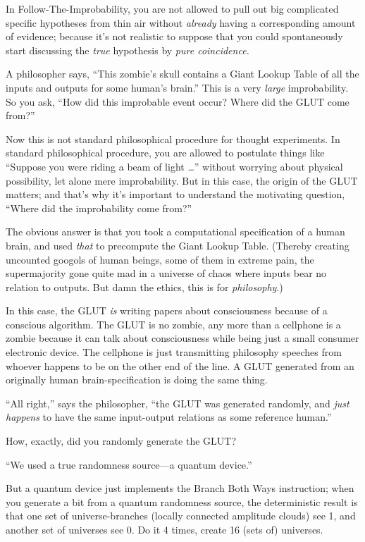{
 In Follow-The-Improbability, you are not allowed to pull out big
complicated specific hypotheses from thin air without \textit{already}
having a corresponding amount of evidence; because it's
not realistic to suppose that you could spontaneously start discussing
the \textit{true} hypothesis by \textit{pure coincidence.}}

{
 A philosopher says, ``This
zombie's skull contains a Giant Lookup Table of all the
inputs and outputs for some human's
brain.'' This is a very \textit{large} improbability.
So you ask, ``How did this improbable event occur?
Where did the GLUT come from?''}

{
 Now this is not standard philosophical procedure for thought
experiments. In standard philosophical procedure, you are allowed to
postulate things like ``Suppose you were riding a beam
of light \ldots'' without worrying about physical
possibility, let alone mere improbability. But in this case, the origin
of the GLUT matters; and that's why
it's important to understand the motivating question,
``Where did the improbability come
from?''}

{
 The obvious answer is that you took a computational specification
of a human brain, and used \textit{that} to precompute the Giant Lookup
Table. (Thereby creating uncounted googols of human beings, some of
them in extreme pain, the supermajority gone quite mad in a universe of
chaos where inputs bear no relation to outputs. But damn the ethics,
this is for \textit{philosophy}.)}

{
 In this case, the GLUT \textit{is} writing papers about
consciousness because of a conscious algorithm. The GLUT is no zombie,
any more than a cellphone is a zombie because it can talk about
consciousness while being just a small consumer electronic device. The
cellphone is just transmitting philosophy speeches from whoever happens
to be on the other end of the line. A GLUT generated from an originally
human brain-specification is doing the same thing.}

{
 ``All right,'' says the
philosopher, ``the GLUT was generated randomly, and
\textit{just happens} to have the same input-output relations as some
reference human.''}

{
 How, exactly, did you randomly generate the GLUT?}

{
 ``We used a true randomness source---a quantum
device.''}

{
 But a quantum device just implements the Branch Both Ways
instruction; when you generate a bit from a quantum randomness source,
the deterministic result is that one set of universe-branches (locally
connected amplitude clouds) see 1, and another set of universes see 0.
Do it 4 times, create 16 (sets of) universes.}

